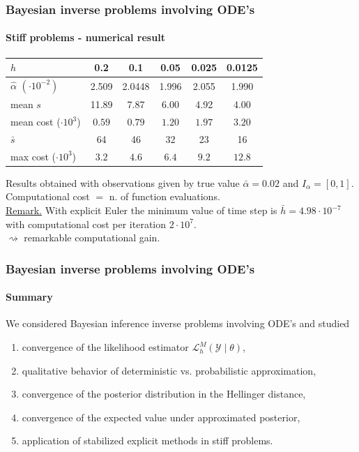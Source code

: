 \documentclass{beamer}
\newcommand{\diffL}{\mathcal{L}}
\begin{document}
\begin{frame}
	\frametitle{Bayesian inverse problems involving ODE's}
	\framesubtitle{Stiff problems - numerical result}
	 \begin{table}[t]
	 	\centering
	 	\begin{tabular}{lccccc}
	 		\hline
	 		$h$ & 0.2 & 0.1 & 0.05 & 0.025 & 0.0125   \\
	 		\hline
	 		$\hat \alpha$ $(\cdot 10^{-2})$ &2.509 & 2.0448 & 1.996 & 2.055 & 1.990 \\
	 		mean $s$ & 11.89  & 7.87 & 6.00 & 4.92 & 4.00 \\
	 		mean cost ($\cdot 10^3$) & $0.59$ & $0.79$ & $1.20$ & $1.97$  & $3.20$ \\
	 		$\bar s$   & 64 & 46 & 32 & 23 & 16 \\ 
	 		max cost ($\cdot 10^3$) & $3.2$ & $4.6$ & $6.4$ & $9.2$ & $12.8$ \\  
	 		\hline
	 	\end{tabular}
	 \end{table}
	Results obtained with observations given by true value $\bar \alpha = 0.02$ and $I_\alpha = [0, 1]$. Computational cost $=$ n. of function evaluations.\\[0.5cm]
	\underline{Remark.} With explicit Euler the minimum value of time step is $\bar h = 4.98\cdot 10^{-7}$ with computational cost per iteration $2 \cdot 10^{7}$. \\
	$\rightsquigarrow$ remarkable computational gain.
		
\end{frame}

\begin{frame}
	\frametitle{Bayesian inverse problems involving ODE's}
	\framesubtitle{Summary}
	
	We considered Bayesian inference inverse problems involving ODE's and studied
	\begin{enumerate}
		\item convergence of the likelihood estimator $\diffL_h^M(\mathcal{Y} \mid \theta)$,
		\item qualitative behavior of deterministic vs. probabilistic approximation,
		\item convergence of the posterior distribution in the Hellinger distance,
		\item convergence of the expected value under approximated posterior,
		\item application of stabilized explicit methods in stiff problems.
	\end{enumerate}
	
\end{frame}
\end{document}
